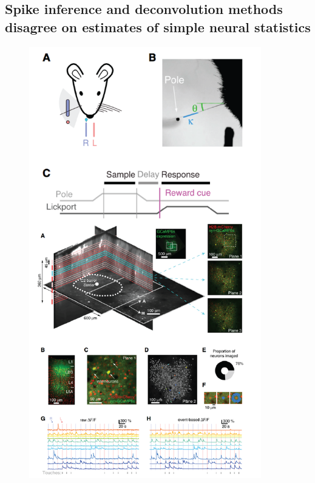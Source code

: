 \documentclass[a4paper,10pt,twocolumn]{article}
\begin{document}
\subsection{Spike inference and deconvolution methods disagree on estimates of simple neural statistics}

\begin{figure}[h!]
        \includegraphics[width=0.9\textwidth]{full_figs/why_deconvolve_F2.png}

\end{figure}
\end{document}

